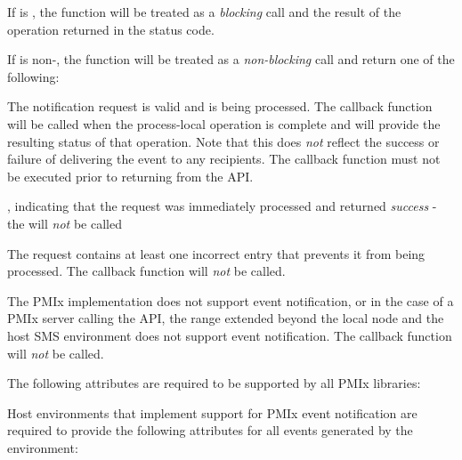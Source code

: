 If  is , the function will be treated as a \emph{blocking} call and the result of the operation returned in the status code.

If  is non-, the function will be treated as a \emph{non-blocking} call and return one of the following:

\begin{constantdesc}
\item {} The notification request is valid and is being processed. The callback function will be called when the process-local operation is complete and will provide the resulting status of that operation. Note that this does \textit{not} reflect the success or failure of delivering the event to any recipients. The callback function must not be executed prior to returning from the \ac{API}.
\item {}, indicating that the request was immediately processed and returned \textit{success} - the  will \textit{not} be called
\item {} The request contains at least one incorrect entry that prevents it from being processed. The callback function will \textit{not} be called.
\item {} The \ac{PMIx} implementation does not support event notification, or in the case of a \ac{PMIx} server calling the API, the range extended beyond the local node and the host \ac{SMS} environment does not support event notification. The callback function will \textit{not} be called.
\end{constantdesc}

\reqattrstart
The following attributes are required to be supported by all \ac{PMIx} libraries:


\divider

Host environments that implement support for \ac{PMIx} event notification are required to provide the following attributes for all events generated by the environment:


\reqattrend

